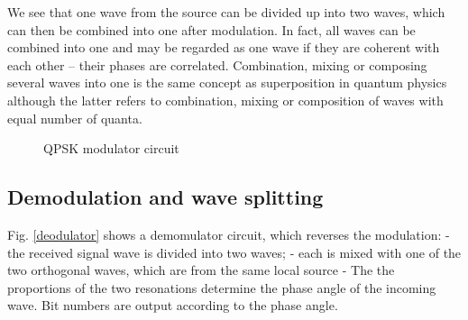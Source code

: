 \documentclass[Letter,11pt]{book}
\begin{document}
We see that one wave from the source can be divided up into two waves, which can then be combined into one after modulation. In fact, all waves can be combined into one and may be regarded as one wave if they are coherent with each other -- their phases are correlated. Combination, mixing or composing several waves into one is the same concept as superposition in quantum physics although the latter refers to combination, mixing or composition of waves with equal number of quanta.

\begin{figure}[ht]
\caption{QPSK modulator circuit}
\label{Modulator}
\end{figure}

\subsection{Demodulation and wave splitting}\label{Demodulation}
Fig. \ref{deodulator} shows a demomulator circuit, which reverses the modulation:
- the received signal wave is divided into two waves;
- each is mixed with one of the two orthogonal waves, which are from the same local source
- The the proportions of the two resonations determine the phase angle of the incoming wave. Bit numbers are output according to the phase angle.
\end{document}
